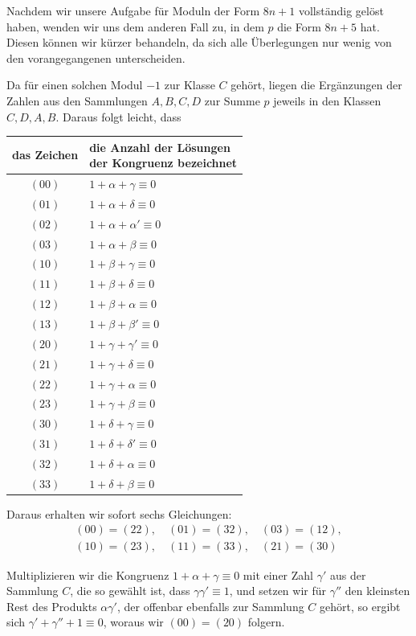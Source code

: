 Nachdem wir unsere Aufgabe für Moduln der Form $8n+1$ vollständig gelöst haben, wenden wir uns dem anderen Fall zu, in dem $p$ die Form $8n+5$ hat. Diesen können wir kürzer behandeln, da sich alle Überlegungen nur wenig von den vorangegangenen unterscheiden.

Da für einen solchen Modul $-1$ zur Klasse $C$ gehört, liegen die Ergänzungen der Zahlen aus den Sammlungen $A,B,C,D$ zur Summe $p$ jeweils in den Klassen $C,D,A,B$. Daraus folgt leicht, dass

%
\begin{center}
\begin{tabular}{c|l}
das Zeichen&\shortstack{die Anzahl der Lösungen\\der Kongruenz bezeichnet}\\\hline
$(00)$&$1+\alpha+\gamma\equiv0$\\
$(01)$&$1+\alpha+\delta\equiv0$\\
$(02)$&$1+\alpha+\alpha'\equiv0$\\
$(03)$&$1+\alpha+\beta\equiv0$\\
$(10)$&$1+\beta+\gamma\equiv0$\\
$(11)$&$1+\beta+\delta\equiv0$\\
$(12)$&$1+\beta+\alpha\equiv0$\\
$(13)$&$1+\beta+\beta'\equiv0$\\
$(20)$&$1+\gamma+\gamma'\equiv0$\\
$(21)$&$1+\gamma+\delta\equiv0$\\
$(22)$&$1+\gamma+\alpha\equiv0$\\
$(23)$&$1+\gamma+\beta\equiv0$\\
$(30)$&$1+\delta+\gamma\equiv0$\\
$(31)$&$1+\delta+\delta'\equiv0$\\
$(32)$&$1+\delta+\alpha\equiv0$\\
$(33)$&$1+\delta+\beta\equiv0$
\end{tabular}
\end{center}
Daraus erhalten wir sofort sechs Gleichungen:
\[
\begin{gathered}
(00)=(22),\quad(01)=(32),\quad(03)=(12),\\
(10)=(23),\quad(11)=(33),\quad(21)=(30)
\end{gathered}
\]

Multiplizieren wir die Kongruenz $1+\alpha+\gamma\equiv0$ mit einer Zahl $\gamma'$ aus der Sammlung $C$, die so gewählt ist, dass $\gamma\gamma'\equiv1$, und setzen wir für $\gamma''$ den kleinsten Rest des Produkts $\alpha\gamma'$, der offenbar ebenfalls zur Sammlung $C$ gehört, so ergibt sich $\gamma'+\gamma''+1\equiv0$, woraus wir $(00)=(20)$ folgern.

